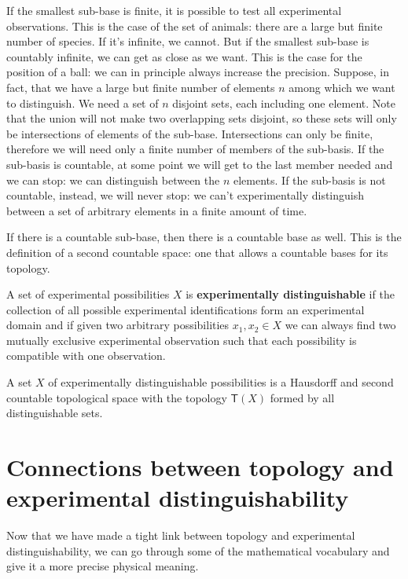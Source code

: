 \documentclass[11pt,letterpaper,fleqn]{memoir} %
\begin{document}
If the smallest sub-base is finite, it is possible to test all experimental observations. This is the case of the set of animals: there are a large but finite number of species. If it's infinite, we cannot. But if the smallest sub-base is countably infinite, we can get as close as we want. This is the case for the position of a ball: we can in principle always increase the precision. Suppose, in fact, that we have a large but finite number of elements $n$ among which we want to distinguish. We need a set of $n$ disjoint sets, each including one element. Note that the union will not make two overlapping sets disjoint, so these sets will only be intersections of elements of the sub-base. Intersections can only be finite, therefore we will need only a finite number of members of the sub-basis. If the sub-basis is countable, at some point we will get to the last member needed and we can stop: we can distinguish between the $n$ elements. If the sub-basis is not countable, instead, we will never stop: we can't experimentally distinguish between a set of arbitrary elements in a finite amount of time.

If there is a countable sub-base, then there is a countable base as well. This is the definition of a second countable space: one that allows a countable bases for its topology.

\begin{defn}
	A set of experimental possibilities $X$ is \textbf{experimentally distinguishable} if the collection of all possible experimental identifications form an experimental domain and if given two arbitrary possibilities $x_1, x_2 \in X$ we can always find two mutually exclusive experimental observation such that each possibility is compatible with one observation.
\end{defn}


\begin{prop}
	A set $X$ of experimentally distinguishable  possibilities is a Hausdorff and second countable topological space with the topology $\mathsf{T}(X)$ formed by all distinguishable sets.
\end{prop}

\section{Connections between topology and experimental distinguishability}

Now that we have made a tight link between topology and experimental distinguishability, we can go through some of the mathematical vocabulary and give it a more precise physical meaning.
\end{document}
